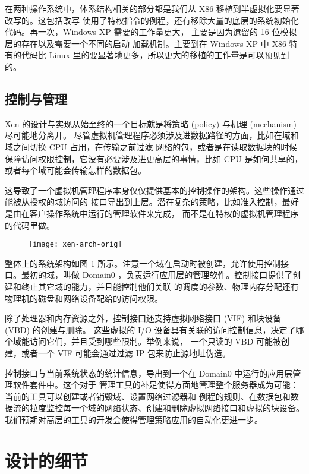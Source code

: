 在两种操作系统中，体系结构相关的部分都是我们从 X86 移植到半虚拟化要显著改写的。这包括改写
使用了特权指令的例程，还有移除大量的底层的系统初始化代码。再一次，Windows XP 需要的工作量更大，
主要是因为遗留的 16 位模拟层的存在以及需要一个不同的启动-加载机制。主要到在 Windows XP 中
X86 特有的代码比 Linux 里的要显著地更多，所以更大的移植的工作量是可以预见到的。

\subsection{控制与管理}

Xen 的设计与实现从始至终的一个目标就是将策略 (policy) 与机理 (mechanism) 尽可能地分离开。
尽管虚拟机管理程序必须涉及进数据路径的方面，比如在域和域之间切换 CPU 占用，在传输之前过滤
网络的包，或者是在读取数据块的时候保障访问权限控制，它没有必要涉及进更高层的事情，比如 CPU
是如何共享的，或者每个域可能会传输怎样的数据包。

这导致了一个虚拟机管理程序本身仅仅提供基本的控制操作的架构。这些操作通过能被从授权的域访问的
接口导出到上层。潜在复杂的策略，比如准入控制，最好是由在客户操作系统中运行的管理软件来完成，
而不是在特权的虚拟机管理程序的代码里做。

\begin{figure}[h]
    \centering
    \texttt{[image: xen-arch-orig]}
\end{figure}

整体上的系统架构如图 1 所示。注意一个域在启动时被创建，允许使用控制接口。最初的域，叫做
Domain0 ，负责运行应用层的管理软件。控制接口提供了创建和终止其它域的能力，并且能控制他们关联
的调度的参数、物理内存分配还有物理机的磁盘和网络设备配给的访问权限。

除了处理器和内存资源之外，控制接口还支持虚拟网络接口 (VIF) 和块设备 (VBD) 的创建与删除。
这些虚拟的 I/O 设备具有关联的访问控制信息，决定了哪个域能访问它们，并且受到哪些限制。举例来说，
一个只读的 VBD 可能被创建，或者一个 VIF 可能会通过过滤 IP 包来防止源地址伪造。

控制接口与当前系统状态的统计信息，导出到一个在 Domain0 中运行的应用层管理软件套件中。这个对于
管理工具的补足使得方面地管理整个服务器成为可能：当前的工具可以创建或者销毁域、设置网络过滤器和
例程的规则、在数据包和数据流的粒度监控每一个域的网络状态、创建和删除虚拟网络接口和虚拟的块设备。
我们预期对高层的工具的开发会使得管理策略应用的自动化更进一步。

\section{设计的细节}

